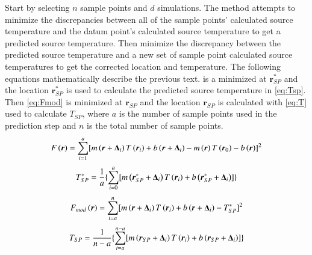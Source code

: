 \documentclass[preprint,12pt]{elsarticle}
\newcommand{\bv}[1]{\boldsymbol #1}  %
\begin{document}
Start by selecting $n$ sample points and $d$ simulations.  The method attempts to minimize the discrepancies between all of the sample points' calculated source temperature and the datum point's calculated source temperature to get a predicted source temperature.  Then minimize the discrepancy between the predicted source temperature and a new set of sample point calculated source temperatures to get the corrected location and temperature.  The following equations mathematically describe the previous text.   is a minimized at $\bv{r^{\ast}_{SP}}$ and the location $\bv{r^{\ast}_{SP}}$ is used to calculate the predicted source temperature in \cref{eq:Tsp}.  Then \cref{eq:Fmod} is minimized at $\bv{r_{SP}}$ and the location $\bv{r_{SP}}$ is calculated with \cref{eq:T} used to calculate $T_{SP}$, where $a$ is the number of sample points used in the prediction step and $n$ is the total number of sample points.
\begin{equation}
\centering
F\left( \bv r \right) =  \sum^{a}_{i=1} [ m\left( \bv r + \bv{\Delta_i}  \right) T\left( \bv{r_i} \right) +b\left( \bv r + \bv{\Delta_i} \right) -m\left( \bv r \right) T\left( \bv{r_0} \right) - b\left( \bv r \right) ]^2  
\label{eq:F}
\end{equation}
%
\begin{equation}
\centering
T^{\ast}_{SP} = \frac{1}{a} \{ \sum^{a}_{i=0} [ m\left( \bv{r^{\ast}_{SP}}+ \bv{\Delta_i}  \right) T\left( \bv{r_i} \right)  + b\left( \bv{r^{\ast}_{SP}}+ \bv{\Delta_i} \right) ] \}
\label{eq:Tsp}
\end{equation}
%
\begin{equation}
\centering
F_{mod}\left( \bv r \right) = \sum^{n}_{i=a} [ m\left( \bv r +\bv{\Delta_i} \right) T\left( \bv{r_i} \right) + b\left( \bv r + \bv{\Delta_i} \right)-T^{\ast}_{SP} ]^2
\label{eq:Fmod}
\end{equation}
%
\begin{equation}
\centering
T_{SP} = \frac{1}{n-a} \{ \sum^{n-a}_{i=a} [ m\left( \bv{r_{SP}}+ \bv{\Delta_i} \right) T\left( \bv{r_i}\right)  + b\left( \bv{r_{SP}}+ \bv{\Delta_i}  \right) ] \}
\label{eq:T}
\end{equation}
\end{document}
